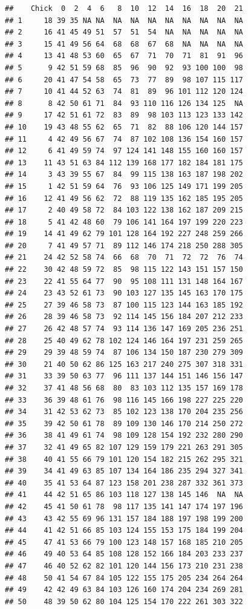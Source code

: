 \documentclass[]{book}
\theoremstyle{definition}
\theoremstyle{definition}
\theoremstyle{definition}
\theoremstyle{remark}
\begin{document}
\begin{verbatim}
##    Chick  0  2  4  6   8  10  12  14  16  18  20  21
## 1     18 39 35 NA NA  NA  NA  NA  NA  NA  NA  NA  NA
## 2     16 41 45 49 51  57  51  54  NA  NA  NA  NA  NA
## 3     15 41 49 56 64  68  68  67  68  NA  NA  NA  NA
## 4     13 41 48 53 60  65  67  71  70  71  81  91  96
## 5      9 42 51 59 68  85  96  90  92  93 100 100  98
## 6     20 41 47 54 58  65  73  77  89  98 107 115 117
## 7     10 41 44 52 63  74  81  89  96 101 112 120 124
## 8      8 42 50 61 71  84  93 110 116 126 134 125  NA
## 9     17 42 51 61 72  83  89  98 103 113 123 133 142
## 10    19 43 48 55 62  65  71  82  88 106 120 144 157
## 11     4 42 49 56 67  74  87 102 108 136 154 160 157
## 12     6 41 49 59 74  97 124 141 148 155 160 160 157
## 13    11 43 51 63 84 112 139 168 177 182 184 181 175
## 14     3 43 39 55 67  84  99 115 138 163 187 198 202
## 15     1 42 51 59 64  76  93 106 125 149 171 199 205
## 16    12 41 49 56 62  72  88 119 135 162 185 195 205
## 17     2 40 49 58 72  84 103 122 138 162 187 209 215
## 18     5 41 42 48 60  79 106 141 164 197 199 220 223
## 19    14 41 49 62 79 101 128 164 192 227 248 259 266
## 20     7 41 49 57 71  89 112 146 174 218 250 288 305
## 21    24 42 52 58 74  66  68  70  71  72  72  76  74
## 22    30 42 48 59 72  85  98 115 122 143 151 157 150
## 23    22 41 55 64 77  90  95 108 111 131 148 164 167
## 24    23 43 52 61 73  90 103 127 135 145 163 170 175
## 25    27 39 46 58 73  87 100 115 123 144 163 185 192
## 26    28 39 46 58 73  92 114 145 156 184 207 212 233
## 27    26 42 48 57 74  93 114 136 147 169 205 236 251
## 28    25 40 49 62 78 102 124 146 164 197 231 259 265
## 29    29 39 48 59 74  87 106 134 150 187 230 279 309
## 30    21 40 50 62 86 125 163 217 240 275 307 318 331
## 31    33 39 50 63 77  96 111 137 144 151 146 156 147
## 32    37 41 48 56 68  80  83 103 112 135 157 169 178
## 33    36 39 48 61 76  98 116 145 166 198 227 225 220
## 34    31 42 53 62 73  85 102 123 138 170 204 235 256
## 35    39 42 50 61 78  89 109 130 146 170 214 250 272
## 36    38 41 49 61 74  98 109 128 154 192 232 280 290
## 37    32 41 49 65 82 107 129 159 179 221 263 291 305
## 38    40 41 55 66 79 101 120 154 182 215 262 295 321
## 39    34 41 49 63 85 107 134 164 186 235 294 327 341
## 40    35 41 53 64 87 123 158 201 238 287 332 361 373
## 41    44 42 51 65 86 103 118 127 138 145 146  NA  NA
## 42    45 41 50 61 78  98 117 135 141 147 174 197 196
## 43    43 42 55 69 96 131 157 184 188 197 198 199 200
## 44    41 42 51 66 85 103 124 155 153 175 184 199 204
## 45    47 41 53 66 79 100 123 148 157 168 185 210 205
## 46    49 40 53 64 85 108 128 152 166 184 203 233 237
## 47    46 40 52 62 82 101 120 144 156 173 210 231 238
## 48    50 41 54 67 84 105 122 155 175 205 234 264 264
## 49    42 42 49 63 84 103 126 160 174 204 234 269 281
## 50    48 39 50 62 80 104 125 154 170 222 261 303 322
\end{verbatim}
\end{document}
